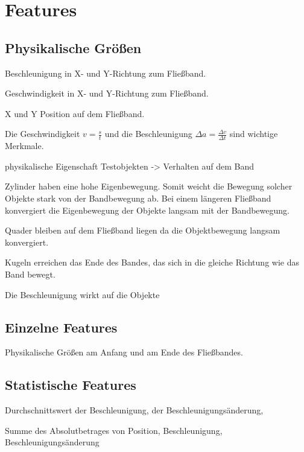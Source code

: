 \section{Features}

\subsection{Physikalische Größen}
Beschleunigung in X- und Y-Richtung zum Fließband.

Geschwindigkeit in X- und Y-Richtung zum Fließband.

X und Y Position auf dem Fließband.

Die Geschwindigkeit \( v = \frac{s}{t} \) und die Beschleunigung \( \Delta a = \frac{\Delta v}{\Delta t} \)
sind wichtige Merkmale. 

physikalische Eigenschaft Testobjekten -> Verhalten auf dem Band

Zylinder haben eine hohe Eigenbewegung. Somit weicht die Bewegung solcher Objekte stark von der Bandbewegung ab. Bei einem längeren Fließband konvergiert die Eigenbewegung der Objekte langsam mit der Bandbewegung. 

Quader bleiben auf dem Fließband liegen da die Objektbewegung langsam konvergiert. 

Kugeln erreichen das Ende des Bandes, das sich in die gleiche Richtung wie das Band bewegt. 

Die Beschleunigung wirkt auf die Objekte

\subsection{Einzelne Features}
Physikalische Größen am Anfang und am Ende des Fließbandes.





\subsection{Statistische Features}
Durchschnittswert der Beschleunigung, der Beschleunigungsänderung,  

Summe des Absolutbetrages von Position, Beschleunigung, Beschleunigungsänderung
